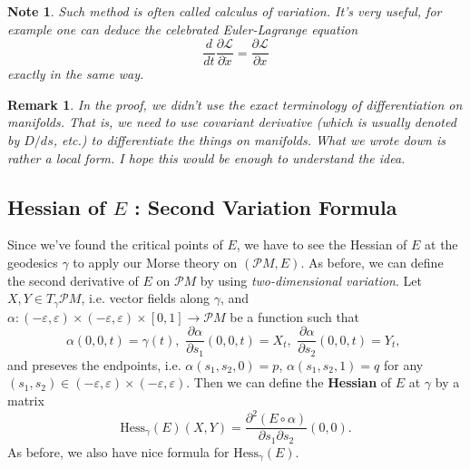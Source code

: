 \documentclass{article}
\newtheorem{note}[theorem]{Note}
\newtheorem{remark}[theorem]{Remark}
\newcommand{\ep}{\varepsilon}
\newcommand{\pp}{\partial}
\newcommand{\PM}{\mathcal{P}M}
\newcommand{\g}{\gamma}
\newcommand{\Hess}{\mathrm{Hess}}
\begin{document}
	\begin{note}\rm
	Such method is often called \emph{calculus of variation}.
It's very useful, for example one can deduce the celebrated \emph{Euler-Lagrange equation}
	$$\frac{d}{dt}\frac{\pp \mathcal{L}}{\pp \dot{x}}=\frac{\pp \mathcal{L}}{\pp x}$$
exactly in the same way.
	\end{note}

	\begin{remark}\rm
	In the proof, we didn't use the exact terminology of differentiation on manifolds.
	That is, we need to use covariant derivative (which is usually denoted by $D/ds$, etc.) to differentiate the things on manifolds.
	What we wrote down is rather a local form.
	I hope this would be enough to understand the idea.
	\end{remark}



\subsection{Hessian of $E$ : Second Variation Formula}
Since we've found the critical points of $E$, we have to see the Hessian of $E$ at the geodesics $\g$ to apply our Morse theory on $(\PM,E)$.
As before, we can define the second derivative of $E$ on $\PM$ by using \emph{two-dimensional variation}.
Let $X,Y\in T_\g\PM$, i.e. vector fields along $\g$, and
$\alpha:(-\ep,\ep)\times(-\ep,\ep)\times[0,1]\to\PM$ be a function such that
	$$\alpha(0,0,t)=\g(t),\,\,\frac{\pp\alpha}{\pp s_1}(0,0,t)=X_t,\,\,\frac{\pp\alpha}{\pp s_2}(0,0,t)=Y_t,\,\,$$
and preseves the endpoints, i.e. $\alpha(s_1,s_2,0)=p$, $\alpha(s_1,s_2,1)=q$ for any $(s_1,s_2)\in(-\ep,\ep)\times(-\ep,\ep)$.
Then we can define the \textbf{Hessian} of $E$ at $\g$ by a matrix
	$$\Hess_\g(E)(X,Y)=\frac{\pp^2(E\circ\alpha)}{\pp s_1\pp s_2}(0,0).$$
As before, we also have nice formula for $\Hess_\g(E)$.
\end{document}
